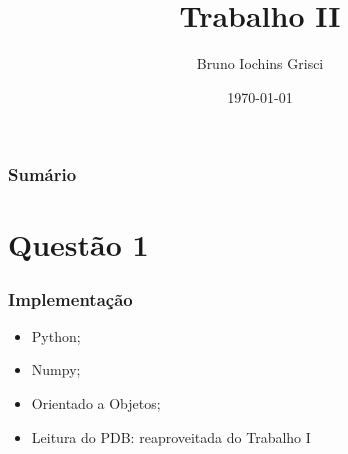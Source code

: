 \documentclass{beamer}
\title[T2]{Trabalho II} %
\author{Bruno Iochins Grisci} %
\institute[UFRGS] %
{
Universidade Federal do Rio Grande do Sul \\ %
\medskip
\textit{bigrisci@inf.ufrgs.br} %
}
\date{\today} %
\begin{document}
\begin{frame}
\titlepage %
\end{frame}

\begin{frame}
\frametitle{Sumário} %
\tableofcontents %
\end{frame}


\section{Questão 1} %

\begin{frame}
\frametitle{Implementação}
\begin{itemize}
\item Python;
\item Numpy;
\item Orientado a Objetos;
\item Leitura do PDB: reaproveitada do Trabalho I
\end{itemize}
\end{frame}
\end{document}
